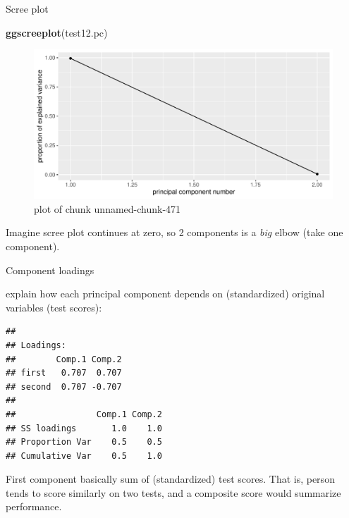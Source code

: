 \documentclass[ignorenonframetext,]{beamer}
\newenvironment{Shaded}{\begin{snugshade}}{\end{snugshade}}
\newcommand{\KeywordTok}[1]{\textcolor[rgb]{0.13,0.29,0.53}{\textbf{#1}}}
\newcommand{\NormalTok}[1]{#1}
\newcommand{\OperatorTok}[1]{\textcolor[rgb]{0.81,0.36,0.00}{\textbf{#1}}}
\begin{document}
\begin{frame}[fragile]{Scree plot}
\protect\hypertarget{scree-plot-1}{}

\begin{Shaded}
\begin{Highlighting}[]
\KeywordTok{ggscreeplot}\NormalTok{(test12.pc)}
\end{Highlighting}
\end{Shaded}

\begin{figure}
\centering
\includegraphics{figure/unnamed-chunk-471-1.pdf}
\caption{plot of chunk unnamed-chunk-471}
\end{figure}

Imagine scree plot continues at zero, so 2 components is a \emph{big}
elbow (take one component).

\end{frame}

\begin{frame}[fragile]{Component loadings}
\protect\hypertarget{component-loadings}{}

explain how each principal component depends on (standardized) original
variables (test scores):

\footnotesize

\begin{Shaded}
\end{Shaded}

\begin{verbatim}
## 
## Loadings:
##        Comp.1 Comp.2
## first   0.707  0.707
## second  0.707 -0.707
## 
##                Comp.1 Comp.2
## SS loadings       1.0    1.0
## Proportion Var    0.5    0.5
## Cumulative Var    0.5    1.0
\end{verbatim}

\normalsize

First component basically sum of (standardized) test scores. That is,
person tends to score similarly on two tests, and a composite score
would summarize performance.

\end{frame}
\end{document}

